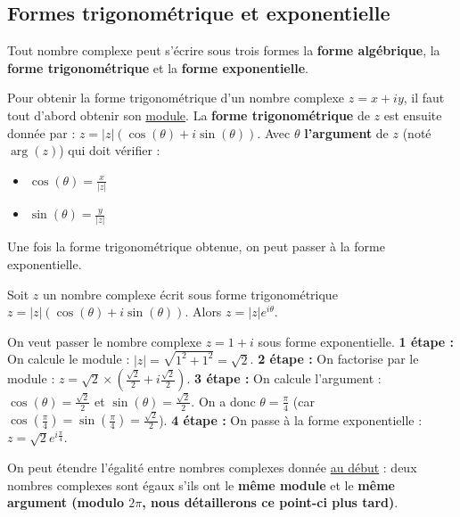 	\subsection{Formes trigonométrique et exponentielle}
	\label{forme-exponentielle}
	
	Tout nombre complexe peut s'écrire sous trois formes la \textbf{forme algébrique}, la \textbf{forme trigonométrique} et la \textbf{forme exponentielle}.
	
	\begin{formula}
		Pour obtenir la forme trigonométrique d'un nombre complexe $z = x + iy$, il faut tout d'abord obtenir son \hyperref[module]{module}. La \textbf{forme trigonométrique} de $z$ est ensuite donnée par : $z = |z| (\cos(\theta) + i\sin(\theta))$.
		\newpar
		Avec $\theta$ \textbf{l'argument} de $z$ (noté $\operatorname{arg}(z)$) qui doit vérifier :
		\begin{itemize}
			\item $\displaystyle{\cos(\theta) = \frac{x}{|z|}}$
			\item $\displaystyle{\sin(\theta) = \frac{y}{|z|}}$
		\end{itemize}
	\end{formula}
	
	Une fois la forme trigonométrique obtenue, on peut passer à la forme exponentielle.
	
	\begin{formula}
		Soit $z$ un nombre complexe écrit sous forme trigonométrique $z = |z| (\cos(\theta) + i\sin(\theta))$. Alors $z = |z| e^{i\theta}$.
	\end{formula}
	
	\begin{tip}[Exemple]
		On veut passer le nombre complexe $z = 1 + i$ sous forme exponentielle.
		\newpar
		\textbf{1\iere{} étape :} On calcule le module : $|z| = \sqrt{1^2 + 1^2} = \sqrt{2}$.
		\newpar
		\textbf{2\ieme{} étape :} On factorise par le module : $z = \sqrt{2} \times (\frac{\sqrt{2}}{2} + i\frac{\sqrt{2}}{2})$.
		\newpar
		\textbf{3\ieme{} étape :} On calcule l'argument : $\cos(\theta) = \frac{\sqrt{2}}{2}$ et $\sin(\theta) = \frac{\sqrt{2}}{2}$.
		On a donc $\theta = \frac{\pi}{4}$ (car $\cos(\frac{\pi}{4}) = \sin(\frac{\pi}{4}) = \frac{\sqrt{2}}{2}$).
		\newpar
		\textbf{4\ieme{} étape :} On passe à la forme exponentielle : $z = \sqrt{2} e^{i\frac{\pi}{4}}$.
	\end{tip}
	
	On peut étendre l'égalité entre nombres complexes donnée \hyperref[egalite]{au début} : deux nombres complexes sont égaux s'ils ont le \textbf{même module} et le \textbf{même argument (modulo $2\pi$, nous détaillerons ce point-ci plus tard)}.
	

